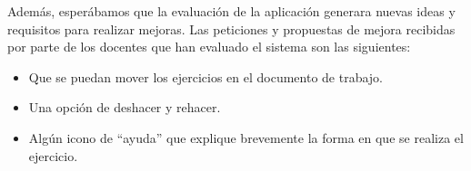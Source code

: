 Además, esperábamos que la evaluación de la aplicación generara nuevas ideas y requisitos para realizar mejoras. Las peticiones y propuestas de mejora recibidas por parte de los docentes que han evaluado el sistema son las siguientes:

\begin{itemize}
    \item Que se puedan mover los ejercicios en el documento de trabajo.
    \item Una opción de deshacer y rehacer.
    \item Algún icono de ``ayuda'' que explique brevemente la forma en que se realiza el ejercicio.    
\end{itemize}



